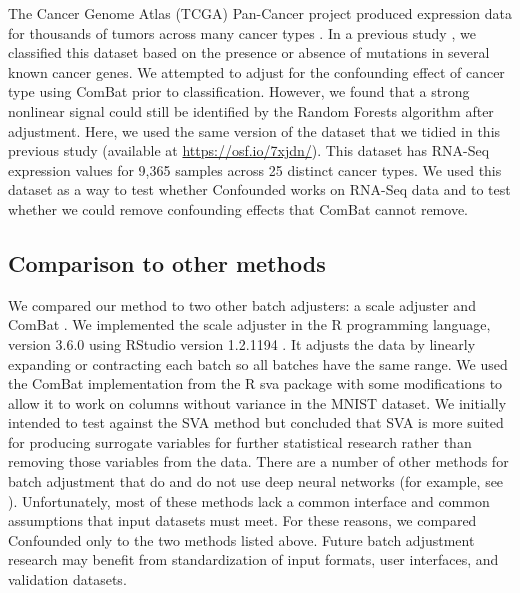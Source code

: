 \documentclass[11pt]{article}
\begin{document}
The Cancer Genome Atlas (TCGA) Pan-Cancer project produced expression data for thousands of tumors across many cancer types \cite{the_cancer_genome_atlas_research_network_cancer_2013}.
In a previous study \cite{dayton_classifying_2017-1}, we classified this dataset based on the presence or absence of mutations in several known cancer genes.
We attempted to adjust for the confounding effect of cancer type using ComBat prior to classification.
However, we found that a strong nonlinear signal could still be identified by the Random Forests algorithm after adjustment.
Here, we used the same version of the dataset that we tidied in this previous study (available at \url{https://osf.io/7xjdn/}).
This dataset has RNA-Seq expression values for 9,365 samples across 25 distinct cancer types.
We used this dataset as a way to test whether Confounded works on RNA-Seq data and to test whether we could remove confounding effects that ComBat cannot remove.

\subsection{Comparison to other methods}

We compared our method to two other batch adjusters: a scale adjuster and ComBat \citep{johnson_adjusting_2007}.
We implemented the scale adjuster in the R programming language, version 3.6.0 \citep{r_core_team_r_2014} using RStudio version 1.2.1194 \citep{rstudio_team_rstudio_2018}.
It adjusts the data by linearly expanding or contracting each batch so all batches have the same range.
We used the ComBat implementation from the R sva package \citep{leek_sva_2017} with some modifications to allow it to work on columns without variance in the MNIST dataset.
We initially intended to test against the SVA \citep{leek_capturing_2007} method but concluded that SVA is more suited for producing surrogate variables for further statistical research rather than removing those variables from the data.
There are a number of other methods for batch adjustment that do and do not use deep neural networks (for example, see \citep{leek_capturing_2007,espin-perez_comparison_2018,shaham_removal_2017,shaham_batch_2018}).
Unfortunately, most of these methods lack a common interface and common assumptions that input datasets must meet.
For these reasons, we compared Confounded only to the two methods listed above.
Future batch adjustment research may benefit from standardization of input formats, user interfaces, and validation datasets.
\end{document}
